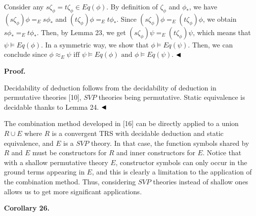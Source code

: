 \documentclass[10pt,a4paper]{amsart}
\begin{document}
 
 
Consider any $s\zeta_{\phi}=t\zeta_{\phi}\in Eq(\phi)$. By definition of $\zeta_{\phi}$ and $\phi_{*}$, we have $(s\zeta_{\phi})\phi=_{E}s\phi_{*}$ and $(t\zeta_{\phi})\phi=_{E}t\phi_{*}$. Since $(s\zeta_{\phi})\phi=_{E}(t\zeta_{\phi})\phi$, we obtain $s\phi_{*}=_{E}t\phi_{*}$. Then, by Lemma 23, we get $(s\zeta_{\phi})\psi=_{E}(t\zeta_{\phi})\psi$, which means that $\psi\models Eq(\phi)$. In a symmetric way, we show that $\phi\models Eq(\psi)$. Then, we can conclude since $\phi\approx_{E}\psi\mbox{ iff }\psi\models Eq(\phi)\mbox{ and }\phi\models Eq(\psi)$. $\hfill\blacktriangleleft$\par
 

 
 
\par\medskip\noindent\textbf{Proof.}\par
 
 
Decidability of deduction follows from the decidability of deduction in permutative theories [10], $\mathit{SVP}$ theories being permutative. Static equivalence is decidable thanks to Lemma 24. $\hfill\blacktriangleleft$\par
 
 
 
The combination method developed in [16] can be directly applied to a union $R\cup E$ where $R$ is a convergent TRS with decidable deduction and static equivalence, and $E$ is a $\mathit{SVP}$ theory. In that case, the function symbols shared by $R$ and $E$ must be constructors for $R$ and inner constructors for $E$. Notice that with a shallow permutative theory $E$, constructor symbols can only occur in the ground terms appearing in $E$, and this is clearly a limitation to the application of the combination method. Thus, considering $\mathit{SVP}$ theories instead of shallow ones allows us to get more significant applications.\par
 
 
 
\par\medskip\noindent\textbf{Corollary 26.}\par
 
\end{document}
